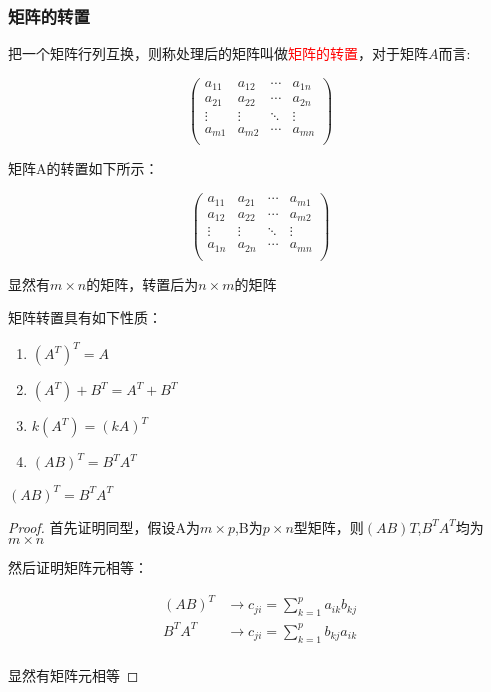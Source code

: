 \subsubsection{矩阵的转置}


把一个矩阵行列互换，则称处理后的矩阵叫做\textcolor{red}{矩阵的转置}，对于矩阵$A$而言:

$$
\begin{pmatrix}
	a_{11} &a_{12}&\cdots&a_{1n}\\
	a_{21}&a_{22}&\cdots&a_{2n}\\
	\vdots&\vdots&\ddots&\vdots\\
	a_{m1}&a_{m2}&\cdots&a_{mn}\\
\end{pmatrix}
$$

矩阵A的转置如下所示：

$$
\begin{pmatrix}
	a_{11} &a_{21}&\cdots&a_{m1}\\
	a_{12}&a_{22}&\cdots&a_{m2}\\
	\vdots&\vdots&\ddots&\vdots\\
	a_{1n}&a_{2n}&\cdots&a_{mn}\\
\end{pmatrix}
$$

显然有$m\times n$的矩阵，转置后为$n\times m$的矩阵

矩阵转置具有如下性质：

\begin{enumerate}
	\item  $(A^T)^T=A$
	\item $(A^T)+B^T=A^T+B^T$
	\item $k(A^T)=(kA)^T$
	\item $(AB)^T=B^TA^T$
\end{enumerate}

\begin{example}
	$(AB)^T=B^TA^T$

	\begin{proof}
		首先证明同型，假设A为$m\times p$,B为$p\times n$型矩阵，则$(AB)T$,$B^TA^T$均为$m\times n$

		然后证明矩阵元相等：

		$$
		\begin{aligned}
			(AB)^T&\rightarrow c_{ji}=\sum_{k=1}^p a_{ik}b_{kj}\\
			B^TA^T&\rightarrow c_{ji}=\sum_{k=1}^p b_{kj}a_{ik}\\
		\end{aligned}
		$$

		显然有矩阵元相等
	\end{proof}
\end{example}

